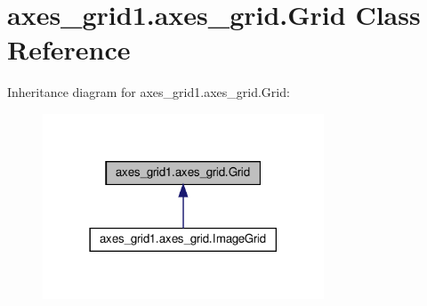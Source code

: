 \hypertarget{classaxes__grid1_1_1axes__grid_1_1Grid}{}\section{axes\+\_\+grid1.\+axes\+\_\+grid.\+Grid Class Reference}
\label{classaxes__grid1_1_1axes__grid_1_1Grid}


Inheritance diagram for axes\+\_\+grid1.\+axes\+\_\+grid.\+Grid\+:
\nopagebreak
\begin{figure}[H]
\begin{center}
\leavevmode
\includegraphics[width=237pt]{classaxes__grid1_1_1axes__grid_1_1Grid__inherit__graph}
\end{center}
\end{figure}
